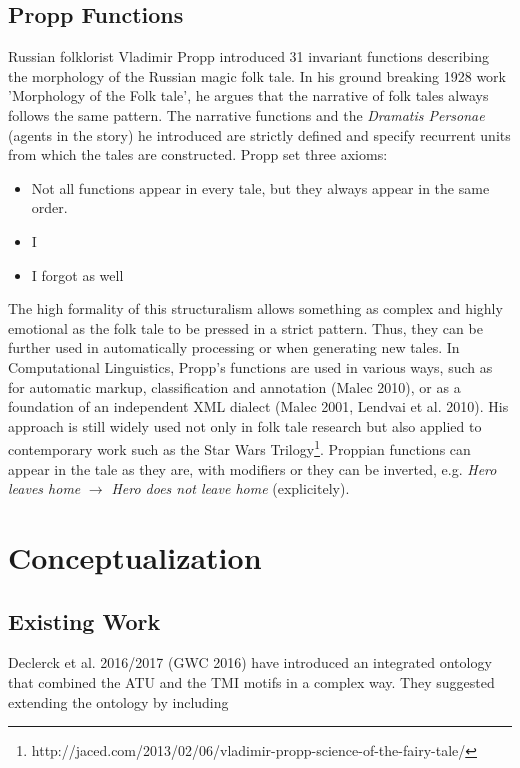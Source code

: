 \documentclass[10pt,a4paper]{article}
\begin{document}
	\subsection{Propp Functions} 
	Russian folklorist Vladimir Propp introduced 31 invariant functions describing the morphology of the Russian magic folk tale. In his ground breaking 1928 work 'Morphology of the Folk tale', he argues that the narrative of folk tales always follows the same pattern. The narrative functions and the \textit{Dramatis Personae} (agents in the story) he introduced are strictly defined and specify recurrent units from which the tales are constructed. 
	Propp set three axioms: 
	
	\begin{itemize}
		\item Not all functions appear in every tale, but they always appear in the same order. 
		\item I 
		\item I forgot as well 
	
	\end{itemize}
	
The high formality of this structuralism allows something as complex and highly emotional as the folk tale to be pressed in a strict pattern. Thus, they can be further used in automatically processing or when generating new tales. In Computational Linguistics, Propp's functions are used in various ways, such as for automatic markup, classification and annotation (Malec 2010), or as a foundation of an independent XML dialect (Malec 2001,  Lendvai et al. 2010). 
	His approach is still widely used not only in folk tale research but also applied to contemporary work such as the Star Wars Trilogy\footnote{http://jaced.com/2013/02/06/vladimir-propp-science-of-the-fairy-tale/}.  Proppian functions can appear in the tale as they are, with modifiers or they can be inverted, e.g. \textit{Hero leaves home} $\rightarrow$ \textit{Hero does not leave home} (explicitely).

\section{Conceptualization}
	\subsection{Existing Work} 
	Declerck et al. 2016/2017 (GWC 2016) have introduced an integrated ontology that combined the ATU and the TMI motifs in a complex way. They suggested extending the ontology by including 
	
\end{document}
